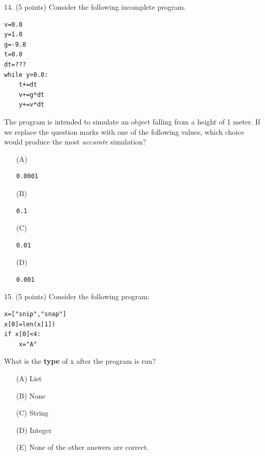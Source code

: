 \documentclass{article}
\newcounter{question}
\begin{document}
\noindent
\begin{minipage}{\textwidth}
14. (5 points)
Consider the following incomplete program.
\begin{verbatim}
v=0.0
y=1.0
g=-9.8
t=0.0
dt=???
while y>0.0:
    t+=dt
    v+=g*dt
    y+=v*dt
\end{verbatim}
The program is intended to simulate an object falling from a height of 1 meter. If we replace the question marks with one of the following values, which choice would produce the most \textit{accurate} simulation?

\begin{enumerate}
\item[(A)]
\begin{verbatim}0.0001\end{verbatim}

\item[(B)]
\begin{verbatim}0.1\end{verbatim}

\item[(C)]
\begin{verbatim}0.01\end{verbatim}

\item[(D)]
\begin{verbatim}0.001\end{verbatim}

\end{enumerate}
\end{minipage}
\vspace{10em}
\filbreak\vfil{}\vfilneg

\noindent
\begin{minipage}{\textwidth}
15. (5 points)
Consider the following program:
\begin{verbatim}
x=["snip","snap"]
x[0]=len(x[1])
if x[0]<4:
    x="A"
\end{verbatim}
What is the \textbf{type} of x after the program is run?

\begin{enumerate}
\item[(A)]
List

\item[(B)]
None

\item[(C)]
String

\item[(D)]
Integer

\item[(E)]
None of the other answers are correct.

\end{enumerate}
\end{minipage}
\vspace{10em}
\filbreak\vfil{}\vfilneg
\end{document}
